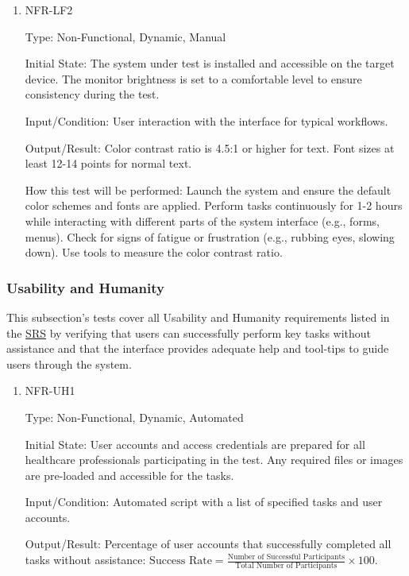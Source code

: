 \documentclass[12pt, titlepage]{article}
\begin{document}
\begin{enumerate}
\begin{enumerate}
\begin{enumerate}
\begin{enumerate}
\item{NFR-LF2\\}\label{NFR-LF2}

Type: Non-Functional, Dynamic, Manual

Initial State: The system under test is installed and accessible on the target device. The monitor brightness is set to a comfortable level to ensure consistency during the test.

Input/Condition: User interaction with the interface for typical workflows.

Output/Result: Color contrast ratio is 4.5:1 or higher for text. Font sizes at least 12-14 points for normal text.

How this test will be performed: Launch the system and ensure the default color schemes and fonts are applied. Perform tasks continuously for 1-2 hours while interacting with different parts of the system interface (e.g., forms, menus). Check for signs of fatigue or frustration (e.g., rubbing eyes, slowing down). Use tools to measure the color contrast ratio.

\end{enumerate}

\subsubsection{Usability and Humanity}

This subsection's tests cover all Usability and Humanity requirements listed in the \href{https://github.com/RezaJodeiri/CXR-Capstone/blob/main/docs/SRS/SRS.pdf}{SRS} \citep{SRS}
 by verifying that users can successfully perform key tasks without assistance and that the interface provides adequate help and tool-tips to guide users through the system.

\begin{enumerate}

\item{NFR-UH1\\}\label{NFR-UH1}

Type: Non-Functional, Dynamic, Automated

Initial State: User accounts and access credentials are prepared for all healthcare professionals participating in the test. Any required files or images are pre-loaded and accessible for the tasks.

Input/Condition: Automated script with a list of specified tasks and user accounts.

Output/Result: Percentage of user accounts that successfully completed all tasks without assistance: $\text{Success Rate} = \frac{\text{Number of Successful Participants}}{\text{Total Number of Participants}} \times 100$.


\end{enumerate}
\end{enumerate}
\end{enumerate}
\end{enumerate}
\end{document}
